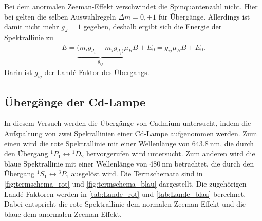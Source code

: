 Bei dem anormalen Zeeman-Effekt verschwindet die Spinquantenzahl nicht.
Hier bei gelten die selben Auswahlregeln $\Delta m=0,\pm 1$ für Übergänge.
Allerdings ist damit nicht mehr $g_J=1$ gegeben, deshalb ergibt sich die Energie der Spektrallinie zu
\begin{align}
	E=\underbrace{(m_ig_{J_i}-m_jg_{J_j)}}_{g_{ij}}\mu_BB+E_0=g_{ij}\mu_BB+E_0.
	\label{eq:anormaler_zeemann_energie}
\end{align}
Darin ist $g_{ij}$ der Landé-Faktor des Übergangs.

\subsection{Übergänge der Cd-Lampe}
In diesem Versuch werden die Übergänge von Cadmium untersucht, indem
die Aufspaltung von zwei Spekrallinien einer Cd-Lampe aufgenommen werden.
Zum einen wird die rote Spektrallinie mit einer Wellenlänge von $\SI{643,8}{\nano\meter}$, die durch den Übergang
${}^1P_1\leftrightarrow{}^1D_2$ hervorgerufen wird untersucht.
Zum anderen wird die blaue Spektrallinie mit einer Wellenlänge von $\SI{480}{\nano\meter}$ betrachtet,
die durch den Übergang ${}^1S_1\leftrightarrow{}^3P_1$ ausgelöst wird.
Die Termschemata sind in \cref{fig:termschema_rot} und \cref{fig:termschema_blau} dargestellt.
Die zugehörigen Landé-Faktoren werden in \cref{tab:Lande_rot} und \cref{tab:Lande_blau} berechnet.
Dabei entspricht die rote Spektrallinie dem normalen Zeeman-Effekt und die blaue dem anormalen Zeeman-Effekt.




